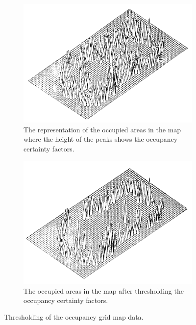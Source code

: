 \begin{figure}[h]
	\centering
	\begin{subfigure}[t]{0.4\linewidth}
		\includegraphics[width=\linewidth]{Figures/Occupancy_Grid_Map/Occupied_Areas_in_Map}
		\caption{The representation of the occupied areas in the map where the height of the peaks shows the occupancy certainty factors.\cite{moravec1985high}}
		\label{fig:OGMwothresh}
	\end{subfigure} \hspace{0.1\textwidth}
	\begin{subfigure}[t]{0.4\linewidth}
		\includegraphics[width=\linewidth]{Figures/Occupancy_Grid_Map/Occupied_Areas_in_Map_after_Thresholding}
		\caption{The occupied areas in the map after thresholding the occupancy certainty factors.\cite{moravec1985high}}
		\label{fig:OGMwthresh}
	\end{subfigure}
	\caption{Thresholding of the occupancy grid map data.}
	\label{fig:OGMw-wothresh}
\end{figure}


